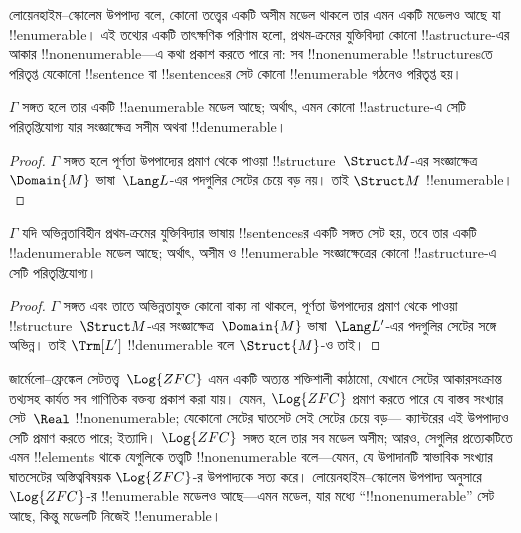 \documentclass[../../../include/open-logic-section]{subfiles}
\begin{document}

লোয়েনহাইম--স্কোলেম উপপাদ্য বলে, কোনো তত্ত্বের একটি অসীম মডেল থাকলে তার
এমন একটি মডেলও আছে যা !!{enumerable}। এই তথ্যের একটি তাৎক্ষণিক
পরিণাম হলো, প্রথম-ক্রমের যুক্তিবিদ্যা কোনো !!a{structure}-এর আকার
!!{nonenumerable}—এ কথা প্রকাশ করতে পারে না: সব !!{nonenumerable}
!!{structure}sতে পরিতৃপ্ত যেকোনো !!{sentence} বা !!{sentence}sর সেট
কোনো !!{enumerable} গঠনেও পরিতৃপ্ত হয়।

\begin{thm}
 $\Gamma$ সঙ্গত হলে তার একটি !!a{enumerable}
মডেল আছে; অর্থাৎ, এমন কোনো !!a{structure}-এ সেটি পরিতৃপ্তিযোগ্য যার
সংজ্ঞাক্ষেত্র সসীম অথবা !!{denumerable}।
\end{thm}

\begin{proof}
$\Gamma$ সঙ্গত হলে পূর্ণতা উপপাদ্যের প্রমাণ থেকে পাওয়া
!!{structure}~$\Struct M$-এর সংজ্ঞাক্ষেত্র~$\Domain{M}$ ভাষা~$\Lang L$-এর
পদগুলির সেটের চেয়ে বড় নয়। তাই $\Struct M$ !!{enumerable}।
\end{proof}

\begin{thm}
 $\Gamma$ যদি অভিন্নতাবিহীন প্রথম-ক্রমের
যুক্তিবিদ্যার ভাষায় !!{sentence}sর একটি সঙ্গত সেট হয়, তবে তার একটি
!!a{denumerable} মডেল আছে; অর্থাৎ, অসীম ও !!{enumerable} সংজ্ঞাক্ষেত্রের
কোনো !!a{structure}-এ সেটি পরিতৃপ্তিযোগ্য।
\end{thm}

\begin{proof}
$\Gamma$ সঙ্গত এবং তাতে অভিন্নতাযুক্ত কোনো বাক্য না থাকলে, পূর্ণতা
উপপাদ্যের প্রমাণ থেকে পাওয়া !!{structure}~$\Struct M$-এর
সংজ্ঞাক্ষেত্র~$\Domain{M}$ ভাষা~$\Lang L'$-এর পদগুলির সেটের সঙ্গে
অভিন্ন। তাই $\Trm[L']$ !!{denumerable} বলে $\Struct{M}$-ও তাই।
\end{proof}

\begin{ex}[স্কোলেমের কূটাভাস]
জার্মেলো--ফ্রেঙ্কেল সেটতত্ত্ব~$\Log{ZFC}$ এমন একটি অত্যন্ত শক্তিশালী
কাঠামো, যেখানে সেটের আকারসংক্রান্ত তথ্যসহ কার্যত সব গাণিতিক বক্তব্য
প্রকাশ করা যায়। যেমন, $\Log{ZFC}$ প্রমাণ করতে পারে যে বাস্তব সংখ্যার
সেট~$\Real$ !!{nonenumerable}; যেকোনো সেটের ঘাতসেট সেই সেটের চেয়ে বড়—
ক্যান্টরের এই উপপাদ্যও সেটি প্রমাণ করতে পারে; ইত্যাদি। $\Log{ZFC}$ সঙ্গত
হলে তার সব মডেল অসীম; আরও, সেগুলির প্রত্যেকটিতে এমন !!{element}s থাকে
যেগুলিকে তত্ত্বটি !!{nonenumerable} বলে—যেমন, যে উপাদানটি স্বাভাবিক
সংখ্যার ঘাতসেটের অস্তিত্ববিষয়ক $\Log{ZFC}$-র উপপাদ্যকে সত্য করে।
লোয়েনহাইম--স্কোলেম উপপাদ্য অনুসারে $\Log{ZFC}$-র !!{enumerable}
মডেলও আছে—এমন মডেল, যার মধ্যে “!!{nonenumerable}” সেট আছে, কিন্তু মডেলটি
নিজেই !!{enumerable}।
\end{ex}
\end{document}

